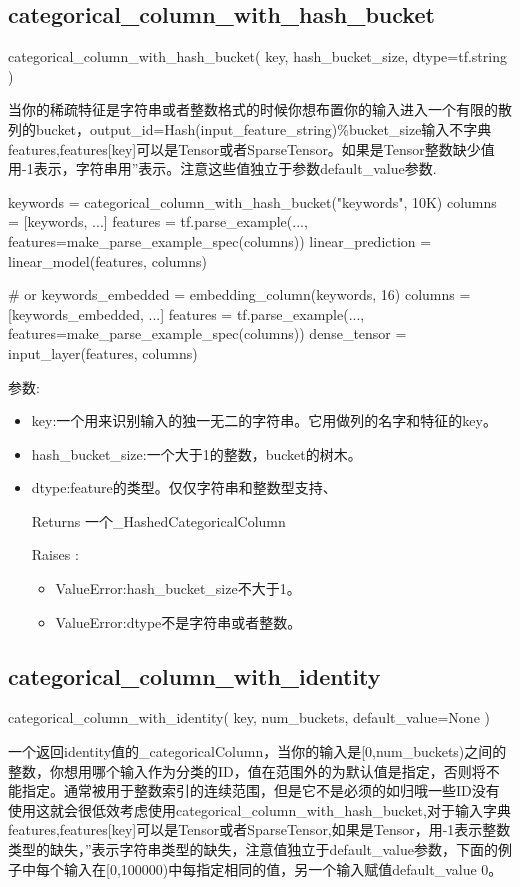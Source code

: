 \subsection{categorical\_column\_with\_hash\_bucket}
\begin{python}
categorical_column_with_hash_bucket(
    key,
    hash_bucket_size,
    dtype=tf.string
)
\end{python}
当你的稀疏特征是字符串或者整数格式的时候你想布置你的输入进入一个有限的散列的bucket，output\_id=Hash(input\_feature\_string)\%bucket\_size输入不字典features,features[key]可以是Tensor或者SparseTensor。如果是Tensor整数缺少值用-1表示，字符串用''表示。注意这些值独立于参数default\_value参数.
\begin{python}
keywords = categorical_column_with_hash_bucket("keywords", 10K)
columns = [keywords, ...]
features = tf.parse_example(..., features=make_parse_example_spec(columns))
linear_prediction = linear_model(features, columns)

# or
keywords_embedded = embedding_column(keywords, 16)
columns = [keywords_embedded, ...]
features = tf.parse_example(..., features=make_parse_example_spec(columns))
dense_tensor = input_layer(features, columns)
\end{python}
参数:
\begin{itemize}
	\item key:一个用来识别输入的独一无二的字符串。它用做列的名字和特征的key。
	\item hash\_bucket\_size:一个大于1的整数，bucket的树木。
	\item dtype:feature的类型。仅仅字符串和整数型支持、
	\item[Returns] 一个\_HashedCategoricalColumn
	\item[Raises]:
	\begin{itemize}
		\item ValueError:hash\_bucket\_size不大于1。
		\item ValueError:dtype不是字符串或者整数。
	\end{itemize}
\end{itemize}
\subsection{categorical\_column\_with\_identity}
\begin{python}
categorical_column_with_identity(
    key,
    num_buckets,
    default_value=None
)
\end{python}
一个返回identity值的\_categoricalColumn，当你的输入是[0,num\_buckets)之间的整数，你想用哪个输入作为分类的ID，值在范围外的为默认值是指定，否则将不能指定。通常被用于整数索引的连续范围，但是它不是必须的如归哦一些ID没有使用这就会很低效考虑使用categorical\_column\_with\_hash\_bucket,对于输入字典features,features[key]可以是Tensor或者SparseTensor,如果是Tensor，用-1表示整数类型的缺失，''表示字符串类型的缺失，注意值独立于default\_value参数，下面的例子中每个输入在[0,100000)中每指定相同的值，另一个输入赋值default\_value 0。

